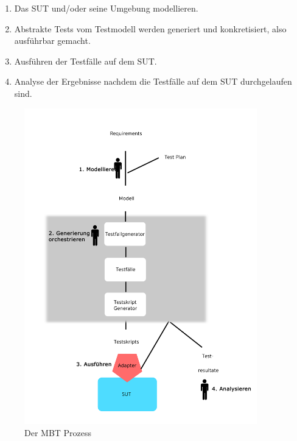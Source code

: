 \begin{enumerate}
\item Das \Gls{SUT} und/oder seine Umgebung modellieren.
\item Abstrakte Tests vom Testmodell werden generiert und konkretisiert, also ausführbar gemacht.
\item Ausführen der Testfälle auf dem SUT.
\item Analyse der Ergebnisse nachdem die Testfälle auf dem \Gls{SUT} durchgelaufen sind.
\end{enumerate}

\begin{figure}[h] 
  \centering
     \includegraphics[width=0.9\textwidth]{figures/MBT_Prozess.png}
  \caption{Der \Gls{MBT} Prozess \cite{utting_practical_2007}}
  \label{fig:mbt_prozess}
\end{figure}

